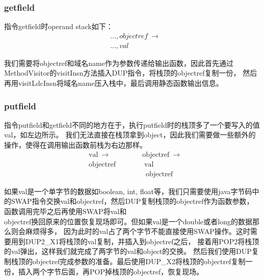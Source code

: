 \documentclass[UTF8]{article}
\begin{document}
\subsubsection{getfield}
指令getfield时operand stack如下：
\begin{equation*}
    \begin{split}
        &\ldots, objectref\ \rightarrow\\
        &\ldots, val
    \end{split}
\end{equation*}

我们需要将objectref和域名name作为参数传递给输出函数，因此首先通过MethodVisitor的visitInsn方法插入DUP指令，将栈顶的objectref复制一份，
然后再用visitLdcInsn将域名name压入栈中，最后调用静态函数输出信息。

\subsubsection{putfield}
指令putfield和getfield不同的地方在于，执行putfield时的栈顶多了一个要写入的值val，如左边所示。
我们无法直接在栈顶拿到object，因此我们需要做一些额外的操作，使得在调用输出函数前栈为右边那样。
\begin{equation*}
    \begin{split}
        &\text{val}\ \rightarrow\qquad\qquad\ \  \text{objectref}\ \rightarrow\\
        &\text{objectref}\qquad\qquad \text{val}\\
        &\qquad\qquad\qquad\qquad\text{objectref}
    \end{split}
\end{equation*}

如果val是一个单字节的数据如boolean, int, float等，我们只需要使用java字节码中的SWAP指令交换val和objectref，然后DUP复制栈顶的objectref作为函数参数，
函数调用完毕之后再使用SWAP将val和\\objectref换回原来的位置恢复现场即可。但如果val是一个double或者long的数据那么则会麻烦得多，
因为此时的val占了两个字节不能直接使用SWAP操作。这时需要用到DUP2\_X1将栈顶的val复制，并插入到objectref之后，
接着用POP2将栈顶的val弹出，这样我们就完成了两字节的val和object的交换。
然后我们使用DUP复制栈顶的objectref完成参数的准备。最后使用DUP\_X2将栈顶的objectref复制一份，插入两个字节后面，再POP掉栈顶的objectref，恢复现场。
\end{document}
